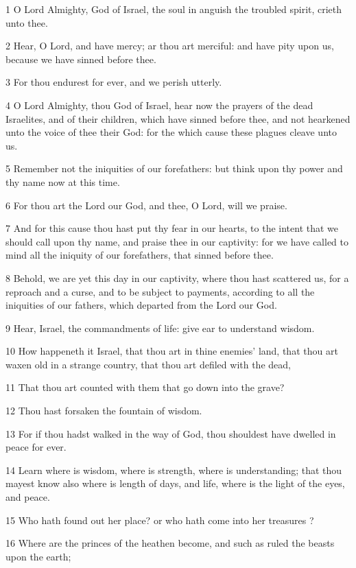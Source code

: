 \par 1 O Lord Almighty, God of Israel, the soul in anguish the troubled spirit, crieth unto thee.
\par 2 Hear, O Lord, and have mercy; ar thou art merciful: and have pity upon us, because we have sinned before thee.
\par 3 For thou endurest for ever, and we perish utterly.
\par 4 O Lord Almighty, thou God of Israel, hear now the prayers of the dead Israelites, and of their children, which have sinned before thee, and not hearkened unto the voice of thee their God: for the which cause these plagues cleave unto us.
\par 5 Remember not the iniquities of our forefathers: but think upon thy power and thy name now at this time.
\par 6 For thou art the Lord our God, and thee, O Lord, will we praise.
\par 7 And for this cause thou hast put thy fear in our hearts, to the intent that we should call upon thy name, and praise thee in our captivity: for we have called to mind all the iniquity of our forefathers, that sinned before thee.
\par 8 Behold, we are yet this day in our captivity, where thou hast scattered us, for a reproach and a curse, and to be subject to payments, according to all the iniquities of our fathers, which departed from the Lord our God.
\par 9 Hear, Israel, the commandments of life: give ear to understand wisdom.
\par 10 How happeneth it Israel, that thou art in thine enemies' land, that thou art waxen old in a strange country, that thou art defiled with the dead,
\par 11 That thou art counted with them that go down into the grave?
\par 12 Thou hast forsaken the fountain of wisdom.
\par 13 For if thou hadst walked in the way of God, thou shouldest have dwelled in peace for ever.
\par 14 Learn where is wisdom, where is strength, where is understanding; that thou mayest know also where is length of days, and life, where is the light of the eyes, and peace.
\par 15 Who hath found out her place? or who hath come into her treasures ?
\par 16 Where are the princes of the heathen become, and such as ruled the beasts upon the earth;
